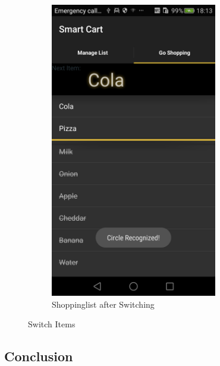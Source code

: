 \begin{figure}[h]
\begin{subfigure}{0.475\textwidth}
\includegraphics[width=0.8\textwidth, height=
0.35\textheight]{res/usermanual/circleRecognized.png}
\caption{Shoppinglist after Switching}
\label{fig:afterSwitching}
\end{subfigure}
\caption{Switch Items}
\label{fig:checkItems}
\end{figure}

\FloatBarrier

\subsection{Conclusion}

